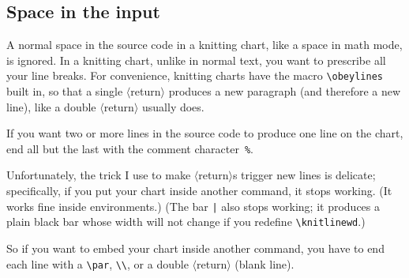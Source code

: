\documentclass[draft]{amsart}
\begin{document}
\subsection{Space in the input}

A normal space in the source code in a knitting chart, like a space in math mode, is ignored.
In a knitting chart, unlike in normal text, you want to prescribe all your line breaks. For convenience, knitting charts have the macro \verb|\obeylines| built in, so that a single $\langle$return$\rangle$ produces a new paragraph (and therefore a new line), like a double $\langle$return$\rangle$ usually does.

If you want two or more lines in the source code to produce one line on the chart, end all but the last with the comment character~\verb|%|.

Unfortunately, the trick I use to make $\langle$return$\rangle$s trigger new lines is delicate; specifically, if you put your chart inside another command, it stops working. (It works fine inside environments.) (The bar \verb?|? also stops working; it produces a plain black bar whose width will not change if you redefine \verb|\knitlinewd|.) 

So if you want to embed your chart inside another command, you have to end each line with a \verb|\par|, \verb|\\|, or a double $\langle$return$\rangle$ (blank line).

\let \saveknitlinewd \knitlinewd
\end{document}
